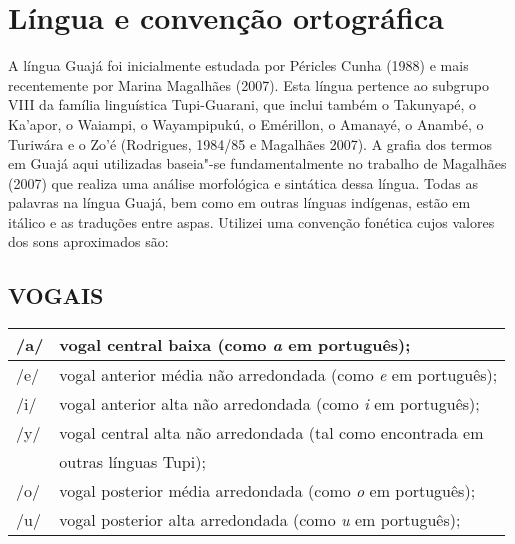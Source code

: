 
\chapter{Língua e convenção
ortográfica}\label{luxedngua-e-convenuxe7uxe3o-ortogruxe1fica}


\noindent A língua Guajá foi inicialmente estudada por Péricles Cunha (1988) e
mais recentemente por Marina Magalhães (2007). Esta língua pertence ao
subgrupo VIII da família linguística Tupi-Guarani, que inclui também o
Takunyapé, o Ka'apor, o Waiampi, o Wayampipukú, o Emérillon, o Amanayé,
o Anambé, o Turiwára e o Zo'é (Rodrigues, 1984/85 e Magalhães 2007). A
grafia dos termos em Guajá aqui utilizadas baseia"-se fundamentalmente no
trabalho de Magalhães (2007) que realiza uma análise morfológica e
sintática dessa língua. Todas as palavras na língua Guajá, bem como em
outras línguas indígenas, estão em itálico e as traduções entre aspas.
Utilizei uma convenção fonética cujos valores dos sons aproximados são:

\section{VOGAIS}

\begin{table}[H]
\scriptsize
\centering
\begin{tabular}{|l|l|}
\hline
/a/ & vogal central baixa (como \emph{a} em português);                                       \\ \hline
/e/ & vogal anterior média não arredondada (como \emph{e} em português);                      \\ \hline
/i/ & vogal anterior alta não arredondada (como \emph{i} em português);                       \\ \hline
/y/ & vogal central alta não arredondada (tal como encontrada em \\ & outras línguas Tupi); \\ \hline
/o/ & vogal posterior média arredondada (como \emph{o} em português);                         \\ \hline
/u/ & vogal posterior alta arredondada (como \emph{u} em português);                          \\ \hline
\end{tabular}
\end{table}


